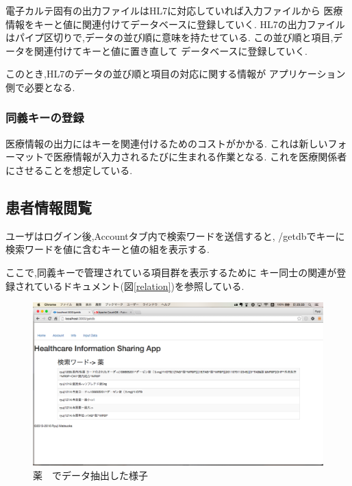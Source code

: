 	電子カルテ固有の出力ファイルはHL7に対応していれば入力ファイルから
	医療情報をキーと値に関連付けてデータベースに登録していく.
	HL7の出力ファイルはパイプ区切りで,データの並び順に意味を持たせている.
	この並び順と項目,データを関連付けてキーと値に置き直して
	データベースに登録していく.

	このとき,HL7のデータの並び順と項目の対応に関する情報が
	アプリケーション側で必要となる.



	\subsubsection{同義キーの登録}
	医療情報の出力にはキーを関連付けるためのコストがかかる.
	これは新しいフォーマットで医療情報が入力されるたびに生まれる作業となる.
	これを医療関係者にさせることを想定している.


\subsection{患者情報閲覧}
	ユーザはログイン後,Accountタブ内で検索ワードを送信すると,
	/getdbでキーに検索ワードを値に含むキーと値の組を表示する.

	ここで,同義キーで管理されている項目群を表示するために
	キー同士の関連が登録されているドキュメント(図\ref{relation})を参照している.
	\\

		\begin{figure}[htbp]
			\begin{center}
				\includegraphics[width=15cm, bb=0 0 1366 1078, clip]{./gazou/getdb.png}
			\end{center}
			\caption{薬　でデータ抽出した様子}
			\label{getdb}
		\end{figure}



